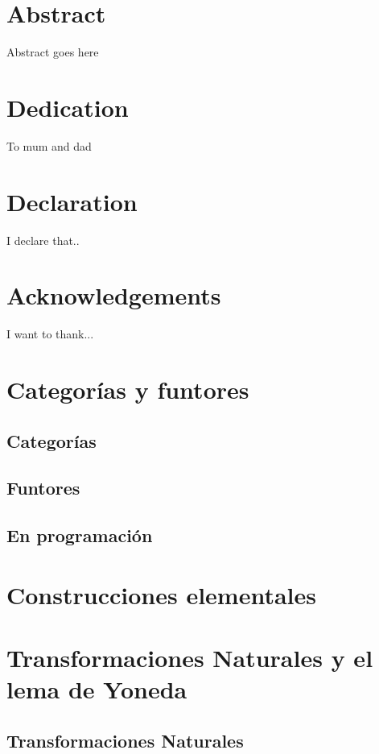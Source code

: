 \documentclass[11pt]{book}
\begin{document}
\tableofcontents

\chapter*{Abstract}
Abstract goes here

\chapter*{Dedication}
To mum and dad

\chapter*{Declaration}
I declare that..

\chapter*{Acknowledgements}
I want to thank...

\tableofcontents

\chapter{Categorías y funtores}
\section{Categorías}

\section{Funtores}

\section{En programación}


\chapter{Construcciones elementales}


\chapter{Transformaciones Naturales y el lema de Yoneda}
\section{Transformaciones Naturales}

\end{document}
